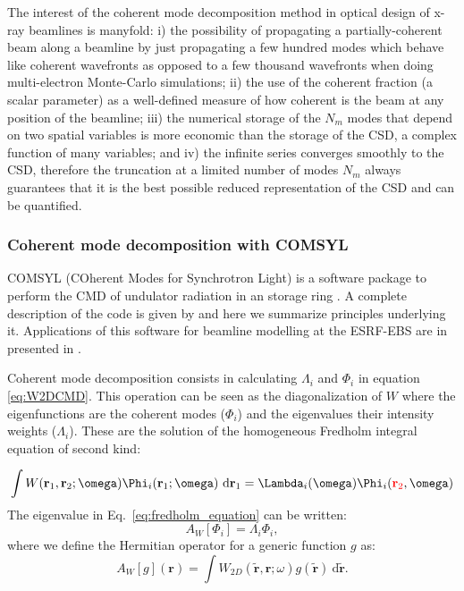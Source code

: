 \documentclass{iucr}              %
\newcommand{\inred}[1]{{\color{red}#1}}
\begin{document}
The interest of the coherent mode decomposition method in optical design of x-ray beamlines is manyfold: i) the possibility of propagating a partially-coherent beam along a beamline by just propagating a few hundred modes which behave like coherent wavefronts as opposed to a few thousand wavefronts when doing multi-electron Monte-Carlo simulations; ii) the use of the coherent fraction (a scalar parameter) as a well-defined measure of how coherent is the beam at any position of the beamline; iii) the numerical storage of the $N_m$ modes that depend on two spatial variables is more economic than the storage of the CSD, a complex function of many variables; and iv) the infinite series converges smoothly to the CSD, therefore the truncation at a limited number of modes $N_m$ always guarantees that it is the best possible reduced representation of the CSD and can be quantified.


\subsubsection{Coherent mode decomposition with COMSYL\\}\label{sec:COMSYL} 
 COMSYL (COherent Modes for Synchrotron Light) is a software package to perform the CMD of undulator radiation in an storage ring \cite{codeCOMSYL}. A complete description of the code is given by  and here we summarize principles underlying it. Applications of this software for beamline modelling at the ESRF-EBS are in presented in \cite{glass2017, hierarchical}. 


Coherent mode decomposition consists in calculating $\Lambda_i$ and $\Phi_i$ in equation \ref{eq:W2DCMD}. This operation can be seen as the diagonalization of $W$ where the eigenfunctions are the coherent modes ($\Phi_i$) and the eigenvalues their intensity weights ($\Lambda_i$). These are the solution of the homogeneous Fredholm integral equation of second kind:

\begin{equation}\label{eq:fredholm_equation}
\int W(\textbf{r}_1,\textbf{r}_2;\omega)
\Phi_i(\textbf{r}_1;\omega)~\text{d}\textbf{r}_1  = \Lambda_i(\omega) \Phi_i(\inred{\textbf{r}_2},\omega)
\end{equation}
The eigenvalue in Eq.~\ref{eq:fredholm_equation} can be written: 
\begin{equation}
A_{W}[\Phi_i] = \Lambda_i \Phi_i,
\end{equation}
where we define the Hermitian operator for a generic function $g$ as:
\begin{equation}\label{eq:Hermitian}
A_{W}[g](\textbf{r})  = \int W_{2D}(\tilde{\textbf{r}},\textbf{r};\omega) g(\tilde{\textbf{r}})~ \text{d}\tilde{\textbf{r}}.
\end{equation}
\end{document}
